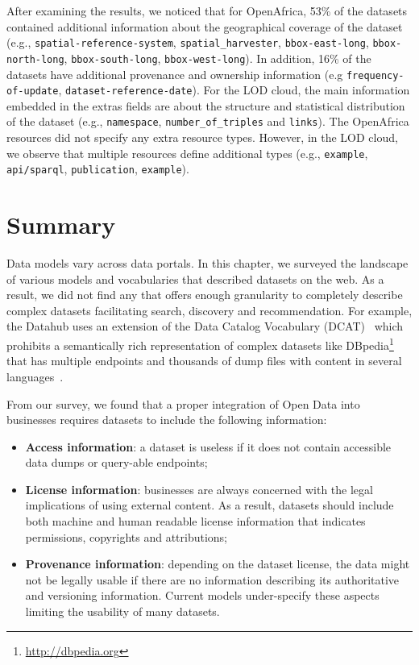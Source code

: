 After examining the results, we noticed that for OpenAfrica, 53\% of the datasets contained additional information about the geographical coverage of the dataset (e.g., \texttt{spatial-reference-system}, \texttt{spatial\_harvester}, \texttt{bbox-east-long}, \texttt{bbox-north-long}, \texttt{bbox-south-long}, \texttt{bbox-west-long}). In addition, 16\% of the datasets have additional provenance and ownership information (e.g \texttt{frequency-of-update}, \texttt{dataset-reference-date}). For the LOD cloud, the main information embedded in the extras fields are about the structure and statistical distribution of the dataset (e.g., \texttt{namespace}, \texttt{number\_of\_triples} and \texttt{links}). The OpenAfrica resources did not specify any extra resource types. However, in the LOD cloud, we observe that multiple resources define additional types (e.g., \texttt{example}, \texttt{api/sparql}, \texttt{publication}, \texttt{example}).

\section{Summary}
\label{section:hdl_summary}

Data models vary across data portals. In this chapter, we surveyed the landscape of various models and vocabularies that described datasets on the web. As a result, we did not find any that offers enough granularity to completely describe complex datasets facilitating search, discovery and recommendation. For example, the Datahub uses an extension of the Data Catalog Vocabulary (DCAT)~\cite{Erickson:DCV:14} which prohibits a semantically rich representation of complex datasets like DBpedia\footnote{\url{http://dbpedia.org}} that has multiple endpoints and thousands of dump files with content in several languages~\cite{Brummer::ICSS:14}.

From our survey, we found that a proper integration of Open Data into businesses requires datasets to include the following information:
\begin{itemize}
	\item \textbf{Access information}: a dataset is useless if it does not contain accessible data dumps or query-able endpoints;
	\item \textbf{License information}: businesses are always concerned with the legal implications of using external content. As a result, datasets should include both machine and human readable license information that indicates permissions, copyrights and attributions;
	\item \textbf{Provenance information}: depending on the dataset license, the data might not be legally usable if there are no information describing its authoritative and versioning information. Current models under-specify these aspects limiting the usability of many datasets.
\end{itemize}

